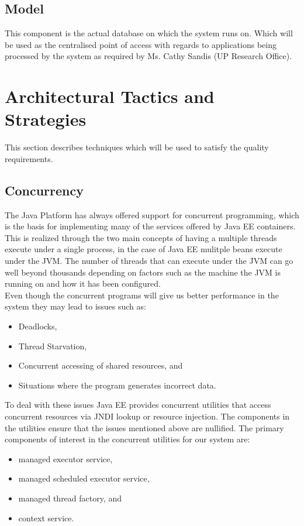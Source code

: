 \documentclass[12pt]{article}
\newcommand{\client}{Ms. Cathy Sandis (UP Research Office)}
\begin{document}
\subsection*{Model}
This component is the actual database on which the system runs on. Which will be used as the centralised point of access with regards to applications being processed by the system as required by \client .
 
\section{Architectural Tactics and Strategies} %
This section describes techniques which will be used to satisfy the quality requirements. 

\subsection{Concurrency}
The Java Platform has always offered support for concurrent programming, which is the basis for implementing many of the services offered by Java EE containers. This is realized through the two main concepts of having a multiple threads execute under a single process, in the case of Java EE mulitple beans execute under the JVM. The number of threads that can execute under the JVM can go well beyond thousands depending on factors such as the machine the JVM is running on and how it has been configured.\\

Even though the concurrent programs will give us better performance in the system they may lead to issues such as:
\begin{itemize}
\item Deadlocks,
\item Thread Starvation,
\item Concurrent  accessing of shared resources, and
\item Situations where the program generates incorrect data.
\end{itemize}

To deal with these issues Java EE provides concurrent utilities that access concurrent resources via JNDI lookup or resource injection. The components in the utilities ensure that the issues mentioned above are nullified. The primary components of interest in the concurrent utilities for our system are:
\begin{itemize}
\item managed executor service, 
\item managed scheduled executor service, 
\item managed thread factory, and 
\item context service.
\end{itemize}
\end{document}
